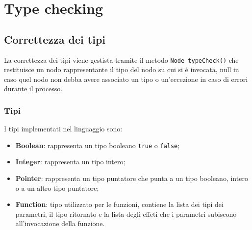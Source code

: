 \documentclass[../main.tex]{subfiles}
\begin{document}
\chapter{Type checking}\label{c:typechecking}
\section{Correttezza dei tipi}
La correttezza dei tipi viene gestista tramite il metodo \verb|Node typeCheck()| che restituisce un nodo rappresentante il tipo del nodo su cui si \`e invocata, null in caso quel nodo non debba avere associato un tipo o  un'eccezione in caso di errori durante il processo.
\subsection{Tipi}
I tipi implementati nel linguaggio sono:
\begin{itemize}
    \item \textbf{Boolean}: rappresenta un tipo booleano \verb|true| o \verb|false|;
    \item \textbf{Integer}: rappresenta un tipo intero;
    \item \textbf{Pointer}: rappresenta un tipo puntatore che punta a un tipo booleano, intero o a un altro tipo puntatore;
    \item \textbf{Function}: tipo utilizzato per le funzioni, contiene la lista dei tipi dei parametri, il tipo ritornato e la lista degli effeti che i parametri subiscono all'invocazione della funzione.
\end{itemize}
\end{document}
